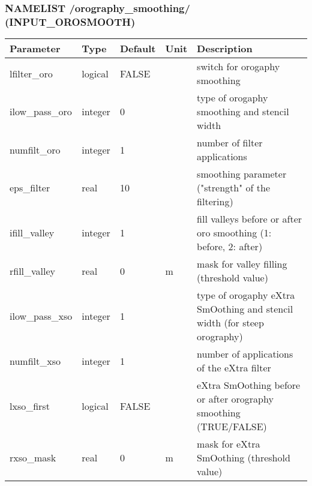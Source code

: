 \documentclass[a4paper,10pt,DIV14,BCOR1cm,titlepage,twoside]{scrartcl}
\providecommand{\tabularnewline}{\\}
\begin{document}
\subsubsection*{NAMELIST /orography\_smoothing/ (INPUT\_OROSMOOTH)}
\begin{longtable}{|p{4cm}|p{1.5cm}|p{1.5cm}|p{1cm}|p{6cm}|}
\hline 
\textbf{Parameter}& \textbf{Type}& \textbf{Default}& \textbf{Unit}& \textbf{Description}
\tabularnewline
\hline
\endhead
\hline
lfilter\_oro & logical & FALSE &  & switch for orogaphy smoothing
\tabularnewline
\hline 
ilow\_pass\_oro & integer & 0 &  & type of orogaphy smoothing and stencil width
\tabularnewline
\hline 
numfilt\_oro & integer & 1 &  & number of filter applications 
\tabularnewline
\hline 
eps\_filter & real & 10 &  & smoothing parameter ("strength" of the filtering)
\tabularnewline
\hline 
ifill\_valley & integer & 1 &  & fill valleys before or after oro smoothing (1: before, 2: after)
\tabularnewline
\hline 
rfill\_valley & real & 0 & m &  mask for valley filling (threshold value)
\tabularnewline
\hline 
ilow\_pass\_xso & integer & 1 &  & type of orogaphy eXtra SmOothing and stencil width (for steep orography)
\tabularnewline
\hline 
numfilt\_xso & integer & 1 &  & number of applications of the eXtra filter
\tabularnewline
\hline 
lxso\_first & logical & FALSE &  & eXtra SmOothing before or after orography smoothing (TRUE/FALSE)
\tabularnewline
\hline
rxso\_mask & real & 0 & m &  mask for eXtra SmOothing (threshold value)
\tabularnewline
\hline
\bottomrule
\end{longtable}
\end{document}
